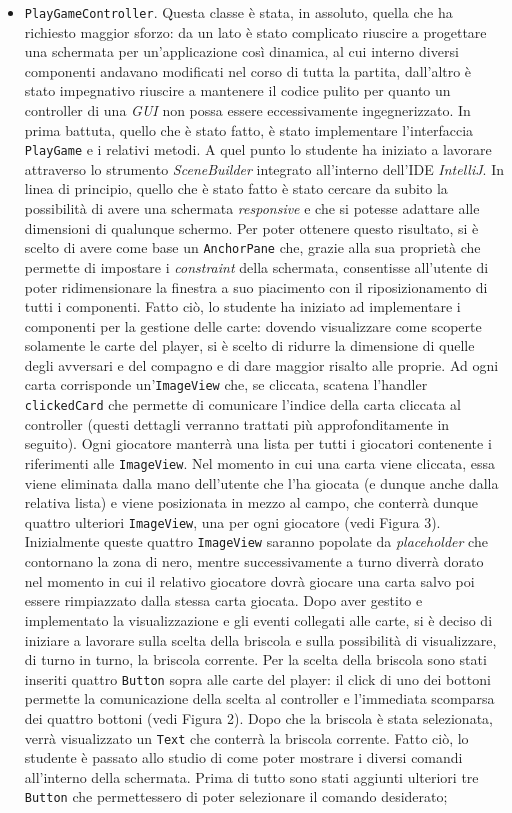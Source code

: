 \begin{itemize}
	\item \texttt{PlayGameController}.
	 Questa classe è stata, in assoluto, quella che ha richiesto maggior sforzo: da un lato è stato complicato riuscire a progettare una schermata per un'applicazione così dinamica, al cui interno  diversi componenti andavano modificati nel corso di tutta la partita, dall'altro è stato impegnativo riuscire a mantenere il codice pulito per quanto un controller di una \textit{GUI} non possa essere eccessivamente ingegnerizzato. In prima battuta, quello che è stato fatto, è stato implementare l'interfaccia \texttt{PlayGame} e i relativi metodi. A quel punto lo studente ha iniziato a lavorare attraverso lo strumento \textit{SceneBuilder} integrato all'interno dell'IDE \textit{IntelliJ}. In linea di principio, quello che è stato fatto è stato cercare da subito la possibilità di avere una schermata \textit{responsive} e che si potesse adattare alle dimensioni di qualunque schermo. Per poter ottenere questo risultato, si è scelto di avere come base un \texttt{AnchorPane} che, grazie alla sua proprietà che permette di impostare i \textit{constraint} della schermata, consentisse all'utente di poter ridimensionare la finestra a suo piacimento con il riposizionamento di tutti i componenti. Fatto ciò, lo studente ha iniziato ad implementare i componenti per la gestione delle carte: dovendo visualizzare come scoperte solamente le carte del player, si è scelto di ridurre la dimensione di quelle degli avversari e del compagno e di dare maggior risalto alle proprie. Ad ogni carta corrisponde un'\texttt{ImageView} che, se cliccata, scatena l'handler \texttt{clickedCard} che permette di comunicare l'indice della carta cliccata al controller (questi dettagli verranno trattati più approfonditamente in seguito). Ogni giocatore manterrà una lista per tutti i giocatori contenente i riferimenti alle \texttt{ImageView}. Nel momento in cui una carta viene cliccata, essa viene eliminata dalla mano dell'utente che l'ha giocata (e dunque anche dalla relativa lista) e viene posizionata in mezzo al campo, che conterrà dunque quattro ulteriori \texttt{ImageView}, una per ogni giocatore (vedi Figura 3). Inizialmente queste quattro \texttt{ImageView} saranno popolate da \textit{placeholder} che contornano la zona di nero, mentre successivamente a turno diverrà dorato nel momento in cui il relativo giocatore dovrà giocare una carta salvo poi essere rimpiazzato dalla stessa carta giocata. Dopo aver gestito e implementato la visualizzazione e gli eventi collegati alle carte, si è deciso di iniziare a lavorare sulla scelta della briscola e sulla possibilità di visualizzare, di turno in turno, la briscola corrente. Per la scelta della briscola sono stati inseriti quattro \texttt{Button} sopra alle carte del player: il click di uno dei bottoni permette la comunicazione della scelta al controller e l'immediata scomparsa dei quattro bottoni (vedi Figura 2). Dopo che la briscola è stata selezionata, verrà visualizzato un \texttt{Text} che conterrà la briscola corrente. Fatto ciò, lo studente è passato allo studio di come poter mostrare i diversi comandi all'interno della schermata. Prima di tutto sono stati aggiunti ulteriori tre \texttt{Button} che permettessero di poter selezionare il comando desiderato; 
\end{itemize}
